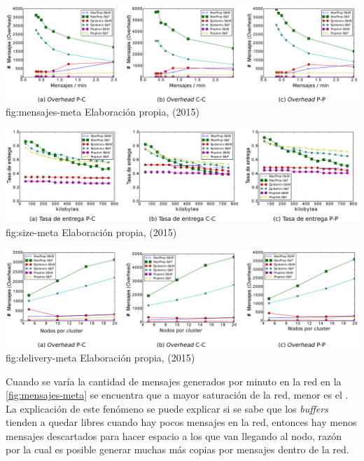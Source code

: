{\includegraphics[scale=0.27]{desarrollo/paper_pasado/graficos/lineas/desde_personas_mensajes.eps}}{fig:mensajes-meta}
{Elaboración propia, (2015)}


{\includegraphics[scale=0.27]{desarrollo/paper_pasado/graficos/lineas/delivery_size.eps}}{fig:size-meta}
{Elaboración propia, (2015)}


{\includegraphics[scale=0.27]{desarrollo/paper_pasado/graficos/lineas/delivery_personas.eps}}{fig:delivery-meta}
{Elaboración propia, (2015)}

Cuando se varía la cantidad de mensajes generados por minuto en la red en la
\ref{fig:mensajes-meta} se encuentra que a mayor saturación de la red, menor es
el \overhead. La explicación de este fenómeno se puede explicar si se sabe que
los \textit{buffers} tienden a quedar libres cuando hay pocos mensajes en la
red, entonces hay menos mensajes descartados para hacer espacio a los que van
llegando al nodo, razón por la cual es posible generar muchas más copias por
mensajes dentro de la red.


